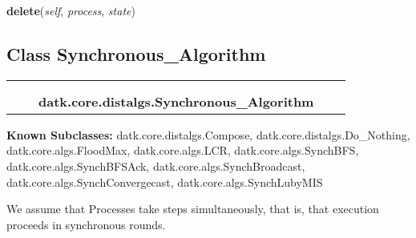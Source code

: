     \vspace{0.5ex}

\hspace{.8\funcindent}\begin{boxedminipage}{\funcwidth}

    \raggedright \textbf{delete}(\textit{self}, \textit{process}, \textit{state})

\setlength{\parskip}{2ex}
\setlength{\parskip}{1ex}
    \end{boxedminipage}



\subsection{Class Synchronous\_Algorithm}

    \label{datk:core:distalgs:Synchronous_Algorithm}
\begin{tabular}{cccccc}
\multicolumn{2}{r}{\settowidth{\BCL}{datk.core.distalgs.Algorithm}\multirow{2}{\BCL}{datk.core.distalgs.Algorithm}}
&&
  \\\cline{3-3}
  &&\multicolumn{1}{c|}{}
&&
  \\
&&\multicolumn{2}{l}{\textbf{datk.core.distalgs.Synchronous\_Algorithm}}
\end{tabular}

\textbf{Known Subclasses:}
datk.core.distalgs.Compose,
    datk.core.distalgs.Do\_Nothing,
    datk.core.algs.FloodMax,
    datk.core.algs.LCR,
    datk.core.algs.SynchBFS,
    datk.core.algs.SynchBFSAck,
    datk.core.algs.SynchBroadcast,
    datk.core.algs.SynchConvergecast,
    datk.core.algs.SynchLubyMIS

We assume that Processes take steps simultaneously, that is, that execution
proceeds in synchronous rounds.



